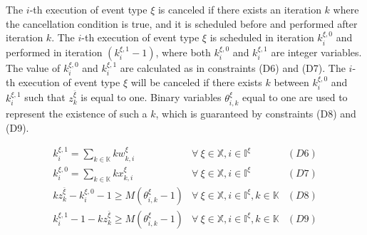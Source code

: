 \documentclass[suppldata]{interact}
\theoremstyle{plain}
\theoremstyle{definition}
\theoremstyle{remark}
\begin{document}
The $i$-th execution of event type ${\xi}$ is canceled if there exists an iteration $k$ where the cancellation condition is true, and it is scheduled before and performed after iteration $k$.
The $i$-th execution of event type ${\xi}$ is scheduled in iteration $k^{\xi,0}_i$ and performed in iteration $(k^{\xi,1}_i-1)$, where both $k^{\xi,0}_i$ and $k^{\xi,1}_i$ are integer variables. 
The value of $k^{\xi,0}_i$ and $k^{\xi,1}_i$ are calculated as in constraints (D6) and (D7). The $i$-th execution of event type ${\xi}$ will be canceled if there exists $k$ between $k^{\xi,0}_i$ and $k^{\xi,1}_i$ such that $z^{\bar{\xi}}_{k}$ is equal to one. Binary variables $\theta^{\xi}_{i,k}$ equal to one are used to represent the existence of such a $k$, which is guaranteed by constraints (D8) and (D9). 

\begin{eqnarray}
	k^{\xi,1}_i = \sum_{k\in \mathbb{K}}kw^{\xi}_{k,i}& \forall\ \xi\in \mathbb{X},i\in \mathbb{I}^{\xi}&(D6)\nonumber\\
	k^{\xi,0}_i = \sum_{k\in \mathbb{K}}kx^{\xi}_{k,i}& \forall\ \xi\in \mathbb{X},i\in \mathbb{I}^{\xi}&(D7)\nonumber\\
	kz^{\bar{\xi}}_k -k^{\xi,0}_i - 1 \ge M(\theta^{\xi}_{i,k}-1)& \forall\ \xi\in \mathbb{X},i\in \mathbb{I}^{\xi},k\in \mathbb{K}&(D8)\nonumber\\
	k^{\xi,1}_i - 1 - kz^{\bar{\xi}}_k \ge M(\theta^{\xi}_{i,k}-1)& \forall\ \xi\in \mathbb{X},i\in \mathbb{I}^{\xi},k\in \mathbb{K}&(D9)\nonumber
\end{eqnarray}
\end{document}
